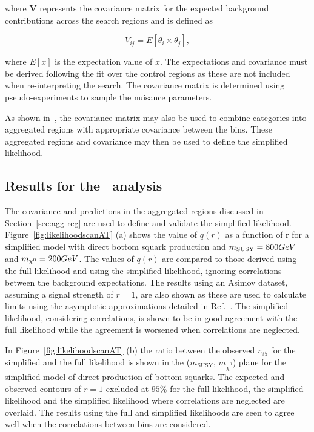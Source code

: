 where $\mathrm{\mathbf{V}}$ represents the covariance matrix for the expected background 
contributions across the search regions and is defined as

\begin{equation}
V_{ij}=E[\theta_i\times\theta_j],
\label{eq-cov}
\end{equation}

where $E[x]$ is the expectation value of $x$. The expectations and covariance
must be derived following the fit over the control regions as these are not
included when re-interpreting the search. The covariance matrix is determined
using pseudo-experiments to sample the nuisance parameters. 

As shown in~\cite{simp-lik}, the covariance matrix may also be used to
combine categories into aggregated regions with appropriate covariance between
the bins. These aggregated regions and covariance may then be used to define 
the simplified likelihood.

\subsection{Results for the \alphat~analysis}

The covariance and predictions in the aggregated regions discussed
in Section~\ref{sec:agg-reg} are used to define and validate the simplified likelihood. 
Figure~\ref{fig:likelihoodscanAT} (a) shows the value of $q(r)$ as a function of r for 
a simplified model with direct bottom squark production and $m_\text{SUSY} = 800 GeV$ 
and $m_{\chi^{0}} = 200 GeV$. The values of $q(r)$ are compared to those derived using the full likelihood and 
using the simplified likelihood, ignoring correlations between the background expectations. 
The results using an Asimov dataset, assuming a signal strength of $r=1$, are also 
shown as these are used to calculate limits using the asymptotic approximations 
detailed in Ref.~\cite{asymp}. The simplified likelihood,
considering correlations, is shown to be in good agreement with the full likelihood while
the agreement is worsened when correlations are neglected.

In Figure~\ref{fig:likelihoodscanAT} (b) the ratio between the observed $r_{95}$ for the simplified 
and the full likelihood is shown in the ($m_{\text{SUSY}}$, $m_{\tilde{\chi}^{0}}$) plane for 
the simplified model of direct production of bottom squarks. The expected and observed contours of $r=1$ 
excluded at $95\%$ for the full likelihood, the simplified likelihood and the 
simplified likelihood where correlations are neglected are overlaid. The results using the 
full and simplified likelihoods are seen to agree well when the correlations between bins are considered.

